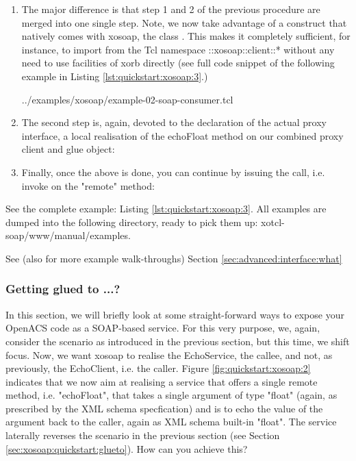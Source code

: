 \begin{enumerate}
\item The major difference is that step 1 and 2 of the previous procedure are merged into one single 
step. Note, we now take advantage of a construct that natively comes with xosoap, the 
class . This makes it completely sufficient, for instance, to import from the Tcl 
namespace ::xosoap::client::* without any need to use facilities of xorb directly (see full code snippet of 
the following example in Listing \ref{lst:quickstart:xosoap:3}.)
\lstset{breaklines=true,numbers=left,basicstyle=\footnotesize,frame=single}

{../examples/xosoap/example-02-soap-consumer.tcl}
\item The second step is, again, devoted to the declaration of the actual proxy interface, a local 
realisation of the echoFloat method on our combined proxy client and glue object:

\item Finally, once the above is done, you can continue by issuing the call, i.e. invoke on the "remote" 
method:

\end{enumerate}

 \begin{hints}
\item See the complete example: Listing \ref{lst:quickstart:xosoap:3}. All examples are dumped into the following directory, ready to pick them up: xotcl-soap/www/manual/examples.
\item See (also for more example walk-throughs) Section \ref{sec:advanced:interface:what}
\end{hints}

  
  \subsubsection{Getting glued to ...?}
  In this section, we will briefly look at some straight-forward ways to expose your OpenACS code as a 
SOAP-based service. For this very purpose, we, again, consider the scenario as introduced in the 
previous section, but this time, we shift focus. Now, we want xosoap to realise the EchoService, the 
callee, and not, as previously, the EchoClient, i.e. the caller. Figure \ref{fig:quickstart:xosoap:2} indicates 
that we now aim at realising a service that offers a single remote method, i.e. "echoFloat", that takes a 
single argument of type "float" (again, as prescribed by the XML schema specfication) and is to echo the 
value of the argument back to the caller, again as XML schema built-in "float". The service laterally 
reverses the scenario in the previous section (see Section \ref{sec:xosoap:quickstart:glueto}). How can you 
achieve this?

